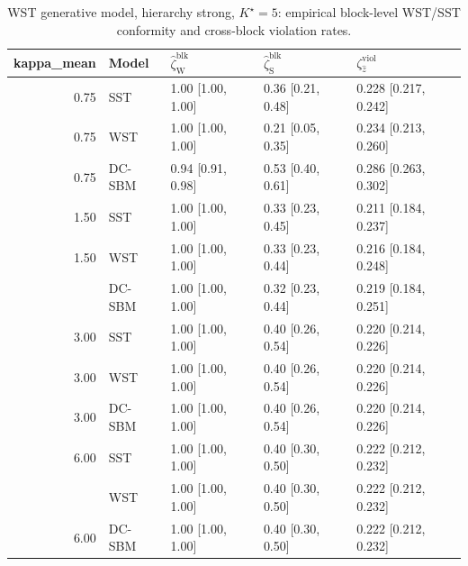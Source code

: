 \begin{table}
\centering
\caption{WST generative model, hierarchy strong, $K^\star=5$: empirical block-level WST/SST conformity and cross-block violation rates.}
\centering
\begin{tabular}[t]{rllll}
\toprule
kappa_mean & Model & $\widehat\zeta_{\mathrm{W}}^{\mathrm{blk}}$ & $\widehat\zeta_{\mathrm{S}}^{\mathrm{blk}}$ & $\zeta^{\mathrm{viol}}_{\hat z}$\\
\midrule
0.75 & SST & 1.00 [1.00, 1.00] & 0.36 [0.21, 0.48] & 0.228 [0.217, 0.242]\\
0.75 & WST & 1.00 [1.00, 1.00] & 0.21 [0.05, 0.35] & 0.234 [0.213, 0.260]\\
0.75 & DC-SBM & 0.94 [0.91, 0.98] & 0.53 [0.40, 0.61] & 0.286 [0.263, 0.302]\\
1.50 & SST & 1.00 [1.00, 1.00] & 0.33 [0.23, 0.45] & 0.211 [0.184, 0.237]\\
1.50 & WST & 1.00 [1.00, 1.00] & 0.33 [0.23, 0.44] & 0.216 [0.184, 0.248]\\
\addlinespace
1.50 & DC-SBM & 1.00 [1.00, 1.00] & 0.32 [0.23, 0.44] & 0.219 [0.184, 0.251]\\
3.00 & SST & 1.00 [1.00, 1.00] & 0.40 [0.26, 0.54] & 0.220 [0.214, 0.226]\\
3.00 & WST & 1.00 [1.00, 1.00] & 0.40 [0.26, 0.54] & 0.220 [0.214, 0.226]\\
3.00 & DC-SBM & 1.00 [1.00, 1.00] & 0.40 [0.26, 0.54] & 0.220 [0.214, 0.226]\\
6.00 & SST & 1.00 [1.00, 1.00] & 0.40 [0.30, 0.50] & 0.222 [0.212, 0.232]\\
\addlinespace
6.00 & WST & 1.00 [1.00, 1.00] & 0.40 [0.30, 0.50] & 0.222 [0.212, 0.232]\\
6.00 & DC-SBM & 1.00 [1.00, 1.00] & 0.40 [0.30, 0.50] & 0.222 [0.212, 0.232]\\
\bottomrule
\end{tabular}
\end{table}
